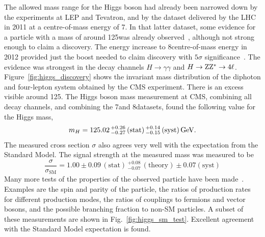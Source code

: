 The allowed mass range for the Higgs boson had already been narrowed down by the experiments at LEP
and Tevatron, and by the dataset delivered by the LHC in 2011 at a centre-of-mass energy of 7\TeV. 
In that latter dataset, some evidence for a particle with a mass of around 125\GeV was already
observed~\cite{Chatrchyan:2012tx}, although not strong enough to claim a discovery. 
The energy increase to 8\TeV centre-of-mass energy in 2012 provided just the boost needed to claim
discovery with $5\sigma$ significance~\cite{Chatrchyan:2012ufa}. The evidence was strongest in the
decay channels $H\rightarrow\gamma\gamma$ and $H\rightarrow\mathrm{Z}\mathrm{Z}^*\rightarrow 4\ell$.
Figure~\ref{fig:higgs_discovery} shows the invariant mass distribution of the diphoton and
four-lepton system obtained by the CMS experiment. There is an excess visible around 125\GeV. 
The Higgs boson mass measurement at CMS, combining all decay channels, and combining the 7\TeV and
8\TeV datasets, found the following value for the Higgs mass,
\begin{equation}
  m_H = 125.02 {\,}^{+0.26}_{-0.27} \, (\text{stat}) {\,}^{+0.14}_{-0.15} \, (\text{syst}) \,\text{Ge\hspace{-.08em}V}.
\end{equation}
The measured cross section $\sigma$ also agrees very well with the expectation from the Standard
Model. The signal strength at the measured mass was measured to be
\begin{equation}
 \frac{\sigma}{\sigma_{\text{SM}}} = 1.00 \pm 0.09 \, (\text{stat})
{\,}^{+0.08}_{-0.07} \, (\text{theory}) \pm 0.07 (\text{syst})
\end{equation}
Many more tests of the properties of the observed particle have been
made~\cite{Khachatryan:2014jba}. Examples are the spin and parity of the particle, the ratios of
production rates for different production modes, the ratios of couplings to fermions and vector
bosons, and the possible branching fraction to non-SM particles. 
A subset of these measurements are shown in Fig.~\ref{fig:higgs_sm_test}. Excellent agreement with
the Standard Model expectation is found.

